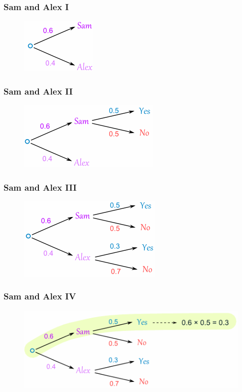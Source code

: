 \documentclass[xcolor=dvipsnames]{beamer}
\begin{document}
\newcommand{\sam}{.65}

\begin{frame}
  \frametitle{Sam and Alex I}
\begin{figure}[h]
\includegraphics[scale=\sam]{./diagrams/sam1.png}
\end{figure}
\end{frame}

\begin{frame}
  \frametitle{Sam and Alex II}
\begin{figure}[h]
\includegraphics[scale=\sam]{./diagrams/sam2.png}
\end{figure}
\end{frame}

\begin{frame}
  \frametitle{Sam and Alex III}
\begin{figure}[h]
\includegraphics[scale=\sam]{./diagrams/sam3.png}
\end{figure}
\end{frame}

\begin{frame}
  \frametitle{Sam and Alex IV}
\begin{figure}[h]
\includegraphics[scale=\sam]{./diagrams/sam4.png}
\end{figure}
\end{frame}
\end{document}
